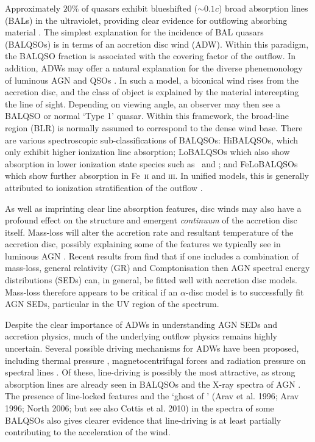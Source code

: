 \documentclass[preprint, a4paper, 11pt]{aastex}
\begin{document}
Approximately $20\%$ of quasars exhibit blueshifted ($\sim 0.1c$)
broad absorption lines (BALs) in the ultraviolet,
providing clear evidence for outflowing absorbing material
\citep{weymann1991, reichard2003, knigge2008, turnermiller2009, allen2011}.
The simplest explanation for the incidence of 
BAL quasars (BALQSOs) is in terms of an accretion disc wind (ADW). 
Within this paradigm, the BALQSO fraction is associated with
the covering factor of the outflow.
In addition, ADWs may offer a natural explanation for the
diverse phenemonology of luminous AGN and QSOs \citep[e.g.][]{MCGV95, elvis2000}. 
In such a model, a biconical wind rises from 
the accretion disc, and the class of object is explained by the material
intercepting the line of sight. Depending on viewing angle, an observer 
may then see a BALQSO or normal `Type 1' quasar.
Within this framework, the broad-line region (BLR) is normally
assumed to correspond to the dense wind base.
There are various spectroscopic sub-classifications of BALQSOs: 
HiBALQSOs, which only exhibit higher
ionization line absorption; LoBALQSOs which also show
absorption in lower ionization state species such as \mg\ and \al; and
FeLoBALQSOs which show further absorption in Fe~\textsc{ii} and \textsc{iii}.
In unified models, this is generally attributed to ionization stratification
of the outflow \citep[e.g.][]{elvis2000}.

As well as imprinting clear line absorption features,
disc winds may also have a profound effect on the structure and 
emergent {\em continuum} of the accretion disc itself.
Mass-loss will alter the accretion rate and resultant 
temperature of the accretion disc, possibly explaining some 
of the features we typically see in luminous AGN \citep{laordavis2014}.
Recent results from \cite{capellupo2015} find 
that if one includes a combination of mass-loss, general relativity (GR) and Comptonisation
then AGN spectral energy distributions (SEDs) can, in general, be fitted well with accretion disc models.
Mass-loss therefore appears to be critical if an $\alpha$-disc
model is to successfully fit AGN SEDs, particular in the UV region of the spectrum.

Despite the clear importance of ADWs in understanding AGN SEDs and accretion physics, 
much of the underlying outflow physics remains highly uncertain. 
Several possible driving mechanisms for ADWs have been proposed, including
thermal pressure \citep{weymann1982, begelman1991}, magnetocentrifugal forces 
\citep{blandfordpayne,pelletier_pudritz} and 
radiation pressure on spectral lines \citep[`line-driving';][]{lucysolomon1970,shlosman1985,MCGV95}.
Of these, line-driving is possibly the most attractive, as
strong absorption lines are already seen in BALQSOs and the X-ray spectra of AGN 
\citep{reeves2003,poundsreeves2009,tombesi2010a}.
The presence of line-locked features \citep{bowler2014} 
and the `ghost of \la' (Arav et al. 1996; Arav 1996; North 2006; but see 
also Cottis et al. 2010) \nocite{arav1995, arav1996, north2006,cottis2010}
in the spectra of some BALQSOs also gives clearer evidence that line-driving is
at least partially contributing to the acceleration of the wind.
\end{document}
